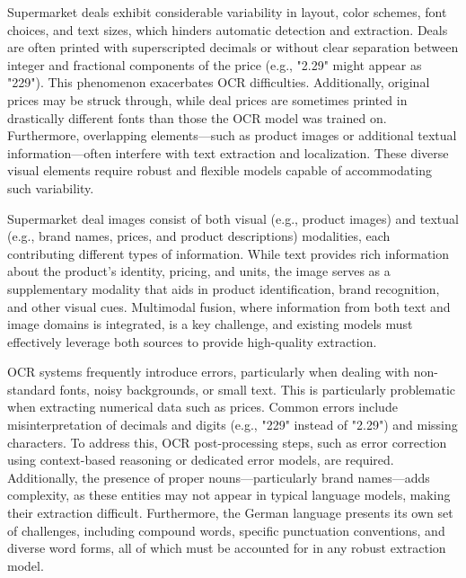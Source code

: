 \documentclass[11pt]{article}
\begin{document}
Supermarket deals exhibit considerable variability in layout, color schemes, font choices, and text sizes, which hinders automatic detection and extraction. Deals are often printed with superscripted decimals or without clear separation between integer and fractional components of the price (e.g., "2.29" might appear as "229"). This phenomenon exacerbates OCR difficulties. Additionally, original prices may be struck through, while deal prices are sometimes printed in drastically different fonts than those the OCR model was trained on. Furthermore, overlapping elements—such as product images or additional textual information—often interfere with text extraction and localization. These diverse visual elements require robust and flexible models capable of accommodating such variability.

Supermarket deal images consist of both visual (e.g., product images) and textual (e.g., brand names, prices, and product descriptions) modalities, each contributing different types of information. While text provides rich information about the product’s identity, pricing, and units, the image serves as a supplementary modality that aids in product identification, brand recognition, and other visual cues. Multimodal fusion, where information from both text and image domains is integrated, is a key challenge, and existing models must effectively leverage both sources to provide high-quality extraction.

OCR systems frequently introduce errors, particularly when dealing with non-standard fonts, noisy backgrounds, or small text. This is particularly problematic when extracting numerical data such as prices. Common errors include misinterpretation of decimals and digits (e.g., "229" instead of "2.29") and missing characters. To address this, OCR post-processing steps, such as error correction using context-based reasoning or dedicated error models, are required. Additionally, the presence of proper nouns—particularly brand names—adds complexity, as these entities may not appear in typical language models, making their extraction difficult. Furthermore, the German language presents its own set of challenges, including compound words, specific punctuation conventions, and diverse word forms, all of which must be accounted for in any robust extraction model.
\end{document}
